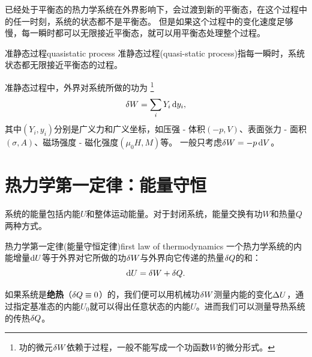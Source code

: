 已经处于平衡态的热力学系统在外界影响下，会过渡到新的平衡态，在这个过程中的任一时刻，系统的状态都不是平衡态。
但是如果这个过程中的变化速度足够慢，每一瞬时都可以无限接近平衡态，就可以用平衡态处理整个过程。

\begin{definition}{准静态过程}{quasistatic process}
	准静态过程(quasi-static process)指每一瞬时，系统状态都无限接近平衡态的过程。
\end{definition}

\begin{corollary}
	准静态过程中，外界对系统所做的功为
	\footnote{功的微元$\mathop{}\!\delta W$依赖于过程，一般不能写成一个功函数$W$的微分形式。}
	\begin{equation}
		\label{eq:dW=Ydy}
		\mathop{}\!\delta W=\sum_iY_i\mathop{}\!\mathrm{d} y_i,
	\end{equation}
	其中$(Y_i,y_i)$分别是广义力和广义坐标，如压强 - 体积$(-p,V)$、表面张力 - 面积$(\sigma,A)$、磁场强度 - 磁化强度$(\mu_0H,M)$等。
	一般只考虑$\mathop{}\!\delta W=-p\mathop{}\!\mathrm{d} V$。
\end{corollary}

\section{热力学第一定律：能量守恒}

系统的能量包括内能$U$和整体运动能量。对于封闭系统，能量交换有功$W$和热量$Q$两种方式。

\begin{theorem}{热力学第一定律(能量守恒定律)}{first law of thermodynamics}
	一个热力学系统的内能增量$\mathop{}\!\mathrm{d} U$等于外界对它所做的功$\mathop{}\!\delta W$与外界向它传递的热量$\mathop{}\!\delta Q$的和：
	\begin{equation}
		\label{eq:dU=dW+dQ}
		\mathop{}\!\mathrm{d} U=\mathop{}\!\delta W+\mathop{}\!\delta Q.
	\end{equation}
\end{theorem}

\begin{remark}
	如果系统是\textbf{绝热}（$\mathop{}\!\delta Q\equiv 0$）的，我们便可以用机械功$\mathop{}\!\delta W$测量内能的变化$\Delta U$，通过指定基准态的内能$U_0$就可以得出任意状态的内能$U$。进而我们可以测量导热系统的传热$\mathop{}\!\delta Q$。
\end{remark}


